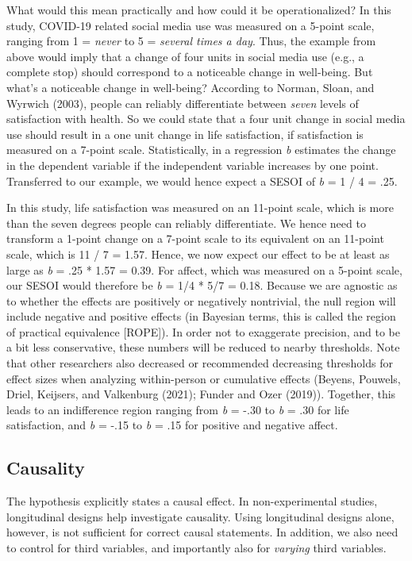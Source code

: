 \documentclass[
  english,
  man,mask,floatsintext]{apa6}
\begin{document}
What would this mean practically and how could it be operationalized?
In this study, COVID-19 related social media use was measured on a 5-point scale, ranging from 1 = \emph{never} to 5 = \emph{several times a day}.
Thus, the example from above would imply that a change of four units in social media use (e.g., a complete stop) should correspond to a noticeable change in well-being.
But what's a noticeable change in well-being?
According to Norman, Sloan, and Wyrwich (2003), people can reliably differentiate between \emph{seven} levels of satisfaction with health.
So we could state that a four unit change in social media use should result in a one unit change in life satisfaction, if satisfaction is measured on a 7-point scale.
Statistically, in a regression \emph{b} estimates the change in the dependent variable if the independent variable increases by one point.
Transferred to our example, we would hence expect a SESOI of \emph{b} = 1 / 4 = .25.

In this study, life satisfaction was measured on an 11-point scale, which is more than the seven degrees people can reliably differentiate.
We hence need to transform a 1-point change on a 7-point scale to its equivalent on an 11-point scale, which is 11 / 7 = 1.57.
Hence, we now expect our effect to be at least as large as \emph{b} = .25 * 1.57 = 0.39.
For affect, which was measured on a 5-point scale, our SESOI would therefore be \emph{b} = 1/4 * 5/7 = 0.18.
Because we are agnostic as to whether the effects are positively or negatively nontrivial, the null region will include negative and positive effects (in Bayesian terms, this is called the region of practical equivalence {[}ROPE{]}).
In order not to exaggerate precision, and to be a bit less conservative, these numbers will be reduced to nearby thresholds.
Note that other researchers also decreased or recommended decreasing thresholds for effect sizes when analyzing within-person or cumulative effects (Beyens, Pouwels, Driel, Keijsers, and Valkenburg (2021); Funder and Ozer (2019)).
Together, this leads to an indifference region ranging from \emph{b} = -.30 to \emph{b} = .30 for life satisfaction, and \emph{b} = -.15 to \emph{b} = .15 for positive and negative affect.

\hypertarget{causality}{%
\subsection{Causality}\label{causality}}

The hypothesis explicitly states a causal effect.
In non-experimental studies, longitudinal designs help investigate causality.
Using longitudinal designs alone, however, is not sufficient for correct causal statements.
In addition, we also need to control for third variables, and importantly also for \emph{varying} third variables.
\end{document}
